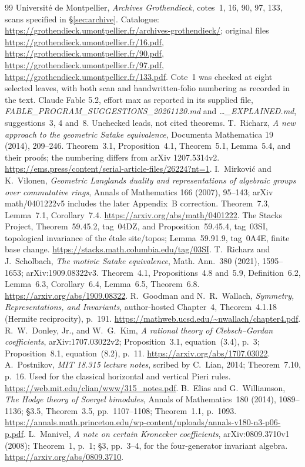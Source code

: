 \begin{thebibliography}{99}
 Universit\'e de Montpellier, \emph{Archives Grothendieck}, cotes~1, 16, 90, 97, 133, scans specified in \S\ref{sec:archive}. Catalogue: \url{https://grothendieck.umontpellier.fr/archives-grothendieck/}; original files \url{https://grothendieck.umontpellier.fr/16.pdf}, \url{https://grothendieck.umontpellier.fr/90.pdf}, \url{https://grothendieck.umontpellier.fr/97.pdf}, \url{https://grothendieck.umontpellier.fr/133.pdf}. Cote~1 was checked at eight selected leaves, with both scan and handwritten-folio numbering as recorded in the text.
 Claude Fable 5.2, effort max as reported in its supplied file, \emph{FABLE\_PROGRAM\_SUGGESTIONS\_20261120.md} and \emph{\ldots\_EXPLAINED.md}, suggestions~3, 4 and~8. Unchecked leads, not cited theorems.
 T.~Richarz, \emph{A new approach to the geometric Satake equivalence}, Documenta Mathematica 19 (2014), 209--246. Theorem~3.1, Proposition~4.1, Theorem~5.1, Lemma~5.4, and their proofs; the numbering differs from arXiv 1207.5314v2. \url{https://ems.press/content/serial-article-files/26224?nt=1}.
 I.~Mirkovi\'c and K.~Vilonen, \emph{Geometric Langlands duality and representations of algebraic groups over commutative rings}, Annals of Mathematics 166 (2007), 95--143; arXiv math/0401222v5 includes the later Appendix~B correction. Theorem~7.3, Lemma~7.1, Corollary~7.4. \url{https://arxiv.org/abs/math/0401222}.
 The Stacks Project, Theorem~59.45.2, tag~04DZ, and Proposition~59.45.4, tag~03SI, topological invariance of the \'etale site/topos; Lemma~59.91.9, tag~0A4E, finite base change. \url{https://stacks.math.columbia.edu/tag/03SI}.
 T.~Richarz and J.~Scholbach, \emph{The motivic Satake equivalence}, Math. Ann.~380 (2021), 1595--1653; arXiv:1909.08322v3. Theorem~4.1, Propositions~4.8 and~5.9, Definition~6.2, Lemma~6.3, Corollary~6.4, Lemma~6.5, Theorem~6.8. \url{https://arxiv.org/abs/1909.08322}.
 R.~Goodman and N.~R.~Wallach, \emph{Symmetry, Representations, and Invariants}, author-hosted Chapter~4, Theorem~4.1.18 (Hermite reciprocity), p.~191. \url{https://mathweb.ucsd.edu/~nwallach/chapter4.pdf}.
 R.~W.~Donley, Jr., and W.~G.~Kim, \emph{A rational theory of Clebsch--Gordan coefficients}, arXiv:1707.03022v2; Proposition~3.1, equation~(3.4), p.~3; Proposition~8.1, equation~(8.2), p.~11. \url{https://arxiv.org/abs/1707.03022}.
 A.~Postnikov, \emph{MIT 18.315 lecture notes}, scribed by C.~Lian, 2014; Theorem~7.10, p.~16. Used for the classical horizontal and vertical Pieri rules. \url{https://web.mit.edu/clian/www/315_notes.pdf}.
 B.~Elias and G.~Williamson, \emph{The Hodge theory of Soergel bimodules}, Annals of Mathematics~180 (2014), 1089--1136; \S3.5, Theorem~3.5, pp.~1107--1108; Theorem~1.1, p.~1093. \url{https://annals.math.princeton.edu/wp-content/uploads/annals-v180-n3-p06-p.pdf}.
 L.~Manivel, \emph{A note on certain Kronecker coefficients}, arXiv:0809.3710v1 (2008); Theorem~1, p.~1; \S3, pp.~3--4, for the four-generator invariant algebra. \url{https://arxiv.org/abs/0809.3710}.


\end{thebibliography}
